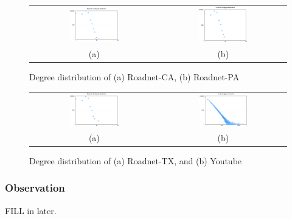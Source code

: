 \begin{figure}[hf]
\begin{center}
\begin{tabular}{cc}
     \includegraphics[width=0.4\textwidth]{FIG/t1_ca.png} &      
     \includegraphics[width=0.4\textwidth]{FIG/t1_pa.png} \\
     (a) & (b)
\end{tabular}
\caption{Degree distribution of (a) Roadnet-CA, (b) Roadnet-PA}
\label{t1:ca}
\end{center}
\end{figure}

\begin{figure}[hf]
\begin{center}
\begin{tabular}{cc}
     \includegraphics[width=0.4\textwidth]{FIG/t1_tx.png} & 
     \includegraphics[width=0.4\textwidth]{FIG/t1_youtube.png} \\
     (a) & (b)
\end{tabular}
\caption{Degree distribution of (a) Roadnet-TX, and (b) Youtube}
\label{t1:tx}
\end{center}
\end{figure}

\subsubsection{Observation}
FILL in later. 